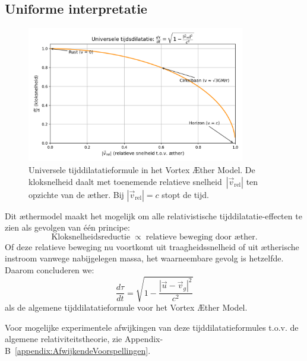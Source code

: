 \subsection*{Uniforme interpretatie}
\begin{figure}[htbp]
    \centering
    \includegraphics[width=0.85\textwidth]{11-TijdsvertragingRelatieveBeweging_nl}
    \caption{Universele tijddilatatieformule in het Vortex Æther Model. De kloksnelheid daalt met toenemende relatieve snelheid~$|\vec{v}_{\mathrm{rel}}|$ ten opzichte van de æther. Bij $|\vec{v}_{\mathrm{rel}}| = c$ stopt de tijd.}
    \label{fig:TijdsvertragingRelatieveBeweging}
\end{figure}

Dit æthermodel maakt het mogelijk om alle relativistische tijddilatatie-effecten te zien als gevolgen van één principe:
\[
    \text{Kloksnelheidsreductie} \;\propto\; \text{relatieve beweging door æther}.
\]
Of deze relatieve beweging nu voortkomt uit traagheidssnelheid of uit ætherische instroom vanwege nabijgelegen massa, het waarneembare gevolg is hetzelfde. Daarom concluderen we:
\[
    \boxed{\frac{d\tau}{dt} = \sqrt{1 - \frac{|\vec{u} - \vec{v}_g|^2}{c^2}}}
\]
als de algemene tijddilatatieformule voor het Vortex Æther Model.

Voor mogelijke experimentele afwijkingen van deze tijddilatatieformules t.o.v. de algemene relativiteitstheorie, zie Appendix-B~\ref{appendix:AfwijkendeVoorspellingen}.